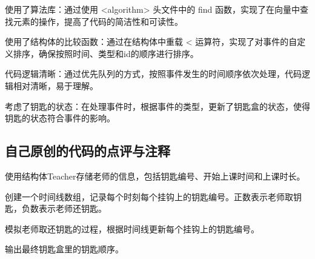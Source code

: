 使用了算法库：通过使用 <algorithm> 头文件中的 find 函数，实现了在向量中查找元素的操作，提高了代码的简洁性和可读性。

使用了结构体的比较函数：通过在结构体中重载 < 运算符，实现了对事件的自定义排序，确保按照时间、类型和id的顺序进行排序。

代码逻辑清晰：通过优先队列的方式，按照事件发生的时间顺序依次处理，代码逻辑相对清晰，易于理解。

考虑了钥匙的状态：在处理事件时，根据事件的类型，更新了钥匙盒的状态，使得钥匙的状态符合事件的影响。

\subsection{自己原创的代码的点评与注释}

使用结构体Teacher存储老师的信息，包括钥匙编号、开始上课时间和上课时长。

创建一个时间线数组，记录每个时刻每个挂钩上的钥匙编号。正数表示老师取钥匙，负数表示老师还钥匙。

模拟老师取还钥匙的过程，根据时间线更新每个挂钩上的钥匙编号。

输出最终钥匙盒里的钥匙顺序。

